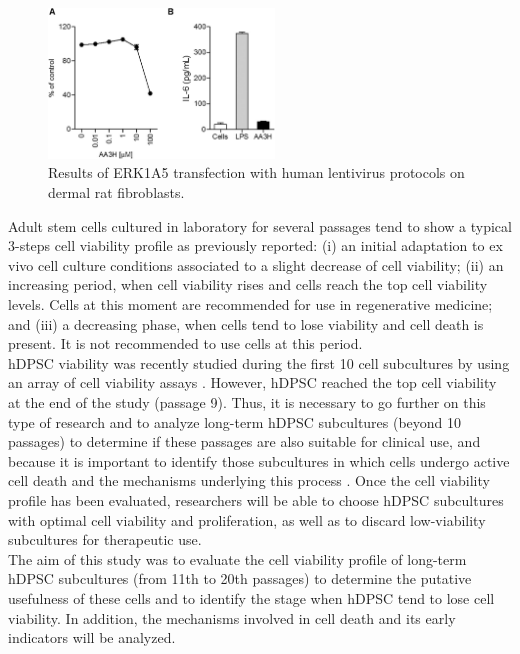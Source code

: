 \documentclass[a4paper,12pt]{article}
\begin{document}
\begin{center}
\begin{figure}
\includegraphics[width=6cm]{fig1}
\caption{Results of ERK1A5 transfection with human lentivirus protocols on dermal rat fibroblasts.}
\label{Figure 1}
\end{figure}
\end{center}

Adult stem cells cultured in laboratory for several passages tend to show a typical 3-steps cell viability profile as previously reported: (i) an initial adaptation to ex vivo cell culture conditions associated to a slight decrease of cell viability; (ii) an increasing  period, when cell viability rises and cells reach the top cell viability levels. Cells at this moment are recommended for use in regenerative medicine; and (iii) a decreasing phase, when cells tend to lose viability and cell death is present. \cite{RN628} It is not recommended to use cells at this period.\\
hDPSC viability was recently studied during the first 10 cell subcultures by using an array of cell viability assays \cite{RN923}. However, hDPSC reached the top cell viability at the end of the study (passage 9). Thus, it is necessary to go further on this type of research and to analyze long-term hDPSC subcultures (beyond 10 passages) to determine if these passages are also suitable for clinical use, and because it is important to identify those subcultures in which cells undergo active cell death and the mechanisms underlying this process \cite{RN985}. Once the cell viability profile has been evaluated, researchers will be able to choose hDPSC subcultures with optimal cell viability and proliferation, as well as to discard low-viability subcultures for therapeutic use.\\
The aim of this study was to evaluate the cell viability profile of long-term hDPSC subcultures (from 11th to 20th passages) to determine the putative usefulness of these cells and to identify the stage when hDPSC tend to lose cell viability. In addition, the mechanisms involved in cell death and its early indicators will be analyzed.
\end{document}
